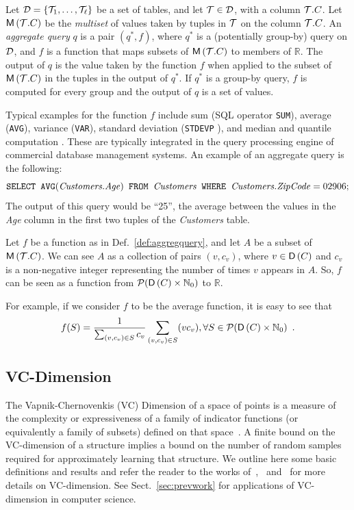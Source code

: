 \begin{definition}\label{def:aggregquery}
  Let ${\cal D}=\{{\cal T}_1,\dotsc,{\cal T}_\ell\}$ be a set of tables, and let ${\cal T}\in {\cal D}$,
  with a column ${\cal T}.C$. Let $\mathsf{M}\left({\cal T}.C\right)$ be the \emph{multiset} of
  values taken by tuples in ${\cal T}$ on the column ${\cal T}.C$. An \emph{aggregate
  query} $q$ is a pair $(q^*,f)$, where $q^*$ is a (potentially group-by) query
  on ${\cal D}$, and $f$ is a function that maps subsets of $\mathsf{M}\left({\cal T}.C\right)$ to members
  of $\mathbb{R}$. The output of $q$ is the value taken by the function $f$ when
  applied to the subset of $\mathsf{M}\left({\cal T}.C\right)$ in the tuples in the output of $q^*$. If
  $q^*$ is a group-by query, $f$ is computed for every group and the output of
  $q$ is a set of values.  
\end{definition}
Typical examples for the function $f$ include sum (SQL operator \texttt{SUM}),
average (\texttt{AVG}), variance (\texttt{VAR}), standard
deviation (\texttt{STDEVP} ), and median
and quantile computation .
These are typically integrated in the query processing engine of commercial
database management systems. An example of an aggregate query is the following:
\[
\mbox{\texttt{SELECT }} \mbox{\texttt{AVG}}(\mbox{\emph{Customers.Age}}) \mbox{\texttt{ FROM }}
\mbox{\emph{Customers}} \mbox{\texttt{ WHERE }} \mbox{\emph{Customers.ZipCode}} = 02906;
\]
The output of this query would be ``25'', the average between the values in the
\emph{Age} column in the first two tuples of the \emph{Customers} table.

\begin{fact}\label{fact:aggregquery}
  Let $f$ be a function as in Def.~\ref{def:aggregquery}, and let $A$ be a 
  subset of $\mathsf{M}\left({\cal T}.C\right)$. We can see $A$ as a collection of pairs
  $(v,c_v)$,
  where $v\in \mathsf{D}\left(C\right)$ and $c_v$ is a non-negative integer representing the number of
  times $v$ appears in $A$. So, $f$ can be seen as a function from
  $\mathcal{P}(\mathsf{D}\left(C\right)\times\mathbb{N}_0)$ to $\mathbb{R}$.
\end{fact}
For example, if we consider $f$ to be the average function, it is easy to see
that
\[
f(S)=\frac{1}{\sum_{(v,c_v)\in S} c_v}\sum_{(v,c_v)\in S}(vc_v), \forall
S\in\mathcal{P}(\mathsf{D}\left(C\right)\times\mathbb{N}_0)\enspace.\]

\subsection{VC-Dimension}\label{sec:prelvcdim}
The Vapnik-Chernovenkis (VC) Dimension of a space of points is a measure of the
complexity or expressiveness of a family of indicator functions (or equivalently
a family of subsets) defined on that space~\cite{VapnikC71}. A finite bound on
the VC-dimension of a structure implies a bound on the number of random samples
required for approximately learning that structure. We outline here some basic
definitions and results and refer the reader to the works
of~\citet[Sect.~14.4]{AlonS08},~\citet{MohriRT12} and~\citet{Vapnik99} for more details
on VC-dimension. See Sect.~\ref{sec:prevwork} for applications of VC-dimension in 
computer science.

